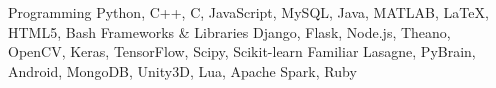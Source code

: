 \begin{cvskills}
  \cvskill
    {Programming}
    {Python, C++, C, JavaScript, MySQL, Java, MATLAB, \LaTeX, HTML5, Bash}
  \cvskill
    {Frameworks \& Libraries}
    {Django, Flask, Node.js, Theano, OpenCV, Keras, TensorFlow, Scipy, Scikit-learn}
  \cvskill
    {Familiar}
    {Lasagne, PyBrain, Android, MongoDB, Unity3D, Lua, Apache Spark, Ruby}
\end{cvskills}